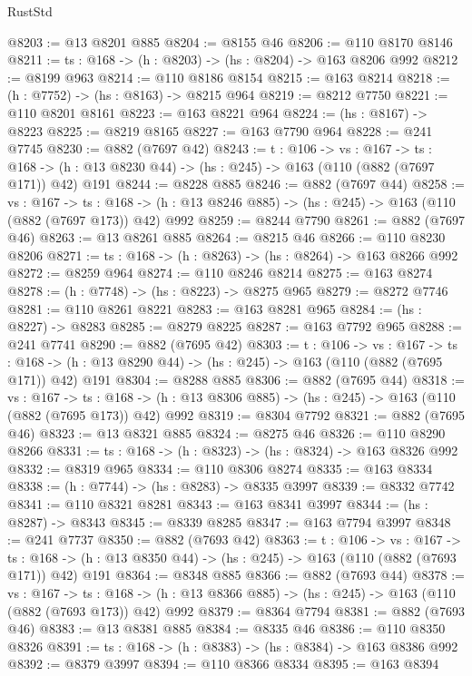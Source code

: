 \begin{lexlean}{RustStd}
\begin{coremodule}
@8203 := @13 @8201 @885
@8204 := @8155 @46
@8206 := @110 @8170 @8146
@8211 := {ts : @168} -> (h : @8203) -> (hs : @8204) -> @163 @8206 @992
@8212 := @8199 @963
@8214 := @110 @8186 @8154
@8215 := @163 @8214
@8218 := (h : @7752) -> (hs : @8163) -> @8215 @964
@8219 := @8212 @7750
@8221 := @110 @8201 @8161
@8223 := @163 @8221 @964
@8224 := (hs : @8167) -> @8223
@8225 := @8219 @8165
@8227 := @163 @7790 @964
@8228 := @241 @7745
@8230 := @882 (@7697 @42)
@8243 := {t : @106} ->
  {vs : @167} ->
  {ts : @168} -> (h : @13 @8230 @44) -> (hs : @245) -> @163 (@110 (@882 (@7697 @171)) @42) @191
@8244 := @8228 @885
@8246 := @882 (@7697 @44)
@8258 := {vs : @167} ->
  {ts : @168} -> (h : @13 @8246 @885) -> (hs : @245) -> @163 (@110 (@882 (@7697 @173)) @42) @992
@8259 := @8244 @7790
@8261 := @882 (@7697 @46)
@8263 := @13 @8261 @885
@8264 := @8215 @46
@8266 := @110 @8230 @8206
@8271 := {ts : @168} -> (h : @8263) -> (hs : @8264) -> @163 @8266 @992
@8272 := @8259 @964
@8274 := @110 @8246 @8214
@8275 := @163 @8274
@8278 := (h : @7748) -> (hs : @8223) -> @8275 @965
@8279 := @8272 @7746
@8281 := @110 @8261 @8221
@8283 := @163 @8281 @965
@8284 := (hs : @8227) -> @8283
@8285 := @8279 @8225
@8287 := @163 @7792 @965
@8288 := @241 @7741
@8290 := @882 (@7695 @42)
@8303 := {t : @106} ->
  {vs : @167} ->
  {ts : @168} -> (h : @13 @8290 @44) -> (hs : @245) -> @163 (@110 (@882 (@7695 @171)) @42) @191
@8304 := @8288 @885
@8306 := @882 (@7695 @44)
@8318 := {vs : @167} ->
  {ts : @168} -> (h : @13 @8306 @885) -> (hs : @245) -> @163 (@110 (@882 (@7695 @173)) @42) @992
@8319 := @8304 @7792
@8321 := @882 (@7695 @46)
@8323 := @13 @8321 @885
@8324 := @8275 @46
@8326 := @110 @8290 @8266
@8331 := {ts : @168} -> (h : @8323) -> (hs : @8324) -> @163 @8326 @992
@8332 := @8319 @965
@8334 := @110 @8306 @8274
@8335 := @163 @8334
@8338 := (h : @7744) -> (hs : @8283) -> @8335 @3997
@8339 := @8332 @7742
@8341 := @110 @8321 @8281
@8343 := @163 @8341 @3997
@8344 := (hs : @8287) -> @8343
@8345 := @8339 @8285
@8347 := @163 @7794 @3997
@8348 := @241 @7737
@8350 := @882 (@7693 @42)
@8363 := {t : @106} ->
  {vs : @167} ->
  {ts : @168} -> (h : @13 @8350 @44) -> (hs : @245) -> @163 (@110 (@882 (@7693 @171)) @42) @191
@8364 := @8348 @885
@8366 := @882 (@7693 @44)
@8378 := {vs : @167} ->
  {ts : @168} -> (h : @13 @8366 @885) -> (hs : @245) -> @163 (@110 (@882 (@7693 @173)) @42) @992
@8379 := @8364 @7794
@8381 := @882 (@7693 @46)
@8383 := @13 @8381 @885
@8384 := @8335 @46
@8386 := @110 @8350 @8326
@8391 := {ts : @168} -> (h : @8383) -> (hs : @8384) -> @163 @8386 @992
@8392 := @8379 @3997
@8394 := @110 @8366 @8334
@8395 := @163 @8394

\end{coremodule}
\end{lexlean}
